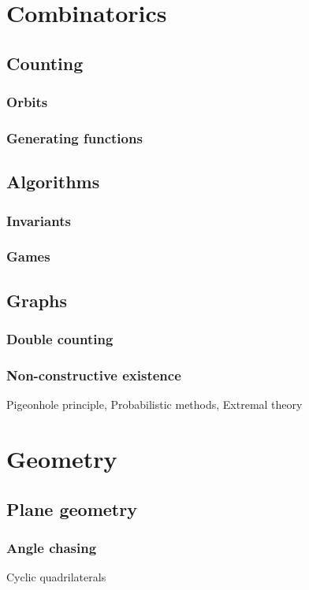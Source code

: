 \documentclass{../../large}
\begin{document}
\part{Combinatorics}

\chapter{Counting}
\section{Orbits}
\section{Generating functions}

\chapter{Algorithms}
\section{Invariants}
\section{Games}

\chapter{Graphs}
\section{Double counting}
\section{Non-constructive existence}
Pigeonhole principle,
Probabilistic methods,
Extremal theory




\part{Geometry}
\chapter{Plane geometry}
\section{Angle chasing}
Cyclic quadrilaterals
\end{document}
